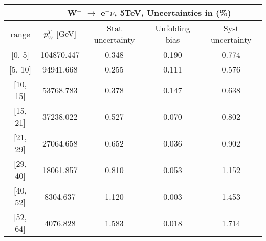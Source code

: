 \documentclass[12pt]{article}
\begin{document}
 
\begin{table}[] 
\begin{tabular}{c|c|c|c|c|}
\cline{2-5}
& \multicolumn{4}{c|}{W$^{-}$ $\rightarrow$ e$^{-} \nu $, 5TeV, Uncertainties in (\%)}  \\ \hline \hline 
\multicolumn{1}{|c|}{  range } & $p^{T}_{W}$ [GeV]     & Stat uncertainty     & Unfolding bias     & Syst uncertainty        \\ \hline \hline 
\multicolumn{1}{|c|}{{[}0,  5{]}}  & 104870.447 & 0.348 & 0.190 & 0.774 \\ \hline 
\multicolumn{1}{|c|}{{[}5,  10{]}}  & 94941.668 & 0.255 & 0.111 & 0.576 \\ \hline 
\multicolumn{1}{|c|}{{[}10,  15{]}}  & 53768.783 & 0.378 & 0.147 & 0.638 \\ \hline 
\multicolumn{1}{|c|}{{[}15,  21{]}}  & 37238.022 & 0.527 & 0.070 & 0.802 \\ \hline 
\multicolumn{1}{|c|}{{[}21,  29{]}}  & 27064.658 & 0.652 & 0.036 & 0.902 \\ \hline 
\multicolumn{1}{|c|}{{[}29,  40{]}}  & 18061.857 & 0.810 & 0.053 & 1.152 \\ \hline 
\multicolumn{1}{|c|}{{[}40,  52{]}}  & 8304.637 & 1.120 & 0.003 & 1.453 \\ \hline 
\multicolumn{1}{|c|}{{[}52,  64{]}}  & 4076.828 & 1.583 & 0.018 & 1.714 \\ \hline 
\end{tabular}
\end{table}
\end{document}
